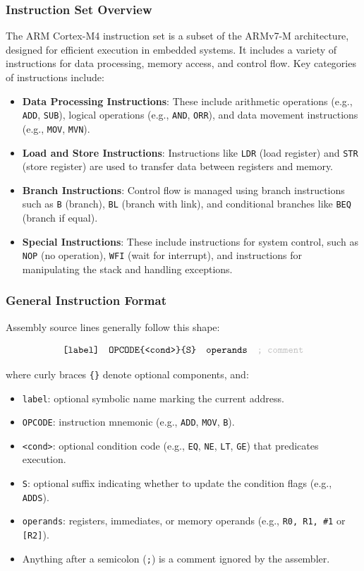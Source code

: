 \subsubsection{Instruction Set Overview}
The ARM Cortex-M4 instruction set is a subset of the ARMv7-M architecture, designed for efficient execution in embedded systems. It includes a variety of instructions for data processing, memory access, and control flow. Key categories of instructions include:
\hfill
\begin{itemize}[nosep]
    \item \textbf{Data Processing Instructions}: These include arithmetic operations (e.g., \texttt{ADD}, \texttt{SUB}), logical operations (e.g., \texttt{AND}, \texttt{ORR}), and data movement instructions (e.g., \texttt{MOV}, \texttt{MVN}).
    \item \textbf{Load and Store Instructions}: Instructions like \texttt{LDR} (load register) and \texttt{STR} (store register) are used to transfer data between registers and memory.
    \item \textbf{Branch Instructions}: Control flow is managed using branch instructions such as \texttt{B} (branch), \texttt{BL} (branch with link), and conditional branches like \texttt{BEQ} (branch if equal).
    \item \textbf{Special Instructions}: These include instructions for system control, such as \texttt{NOP} (no operation), \texttt{WFI} (wait for interrupt), and instructions for manipulating the stack and handling exceptions.
\end{itemize}
\subsubsection{General Instruction Format}

Assembly source lines generally follow this shape:

\[
\texttt{[label]} \quad \texttt{OPCODE\{<cond>\}\{S\}} \quad \texttt{operands} \quad \texttt{\color{lightgray}; comment}
\]

where curly braces \texttt{\{\}} denote optional components, and:
\begin{itemize}[nosep]
  \item \texttt{label}: optional symbolic name marking the current address.
  \item \texttt{OPCODE}: instruction mnemonic (e.g., \texttt{ADD}, \texttt{MOV}, \texttt{B}).
  \item \texttt{<cond>}: optional condition code (e.g., \texttt{EQ}, \texttt{NE}, \texttt{LT}, \texttt{GE}) that predicates execution.
  \item \texttt{S}: optional suffix indicating whether to update the condition flags (e.g., \texttt{ADDS}).
  \item \texttt{operands}: registers, immediates, or memory operands (e.g., \texttt{R0, R1, \#1} or \texttt{[R2]}).
  \item Anything after a semicolon (\texttt{;}) is a comment ignored by the assembler.
\end{itemize}

